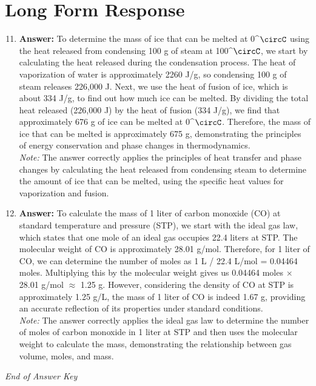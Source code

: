 \documentclass[12pt]{article}
\begin{document}
\section*{Long Form Response}
\begin{enumerate}[label=\arabic*.]
\setcounter{enumi}{10}
\item \textbf{Answer:} To determine the mass of ice that can be melted at 0^\ensuremath{\circC} using the heat released from condensing 100 g of steam at 100^\ensuremath{\circC}, we start by calculating the heat released during the condensation process. The heat of vaporization of water is approximately 2260 J/g, so condensing 100 g of steam releases 226,000 J. Next, we use the heat of fusion of ice, which is about 334 J/g, to find out how much ice can be melted. By dividing the total heat released (226,000 J) by the heat of fusion (334 J/g), we find that approximately 676 g of ice can be melted at 0^\ensuremath{\circC}. Therefore, the mass of ice that can be melted is approximately 675 g, demonstrating the principles of energy conservation and phase changes in thermodynamics.
\\ \textit{Note:} The answer correctly applies the principles of heat transfer and phase changes by calculating the heat released from condensing steam to determine the amount of ice that can be melted, using the specific heat values for vaporization and fusion.
\item \textbf{Answer:} To calculate the mass of 1 liter of carbon monoxide (CO) at standard temperature and pressure (STP), we start with the ideal gas law, which states that one mole of an ideal gas occupies 22.4 liters at STP. The molecular weight of CO is approximately 28.01 g/mol. Therefore, for 1 liter of CO, we can determine the number of moles as 1 L / 22.4 L/mol = 0.04464 moles. Multiplying this by the molecular weight gives us 0.04464 moles \ensuremath{\times} 28.01 g/mol \ensuremath{\approx} 1.25 g. However, considering the density of CO at STP is approximately 1.25 g/L, the mass of 1 liter of CO is indeed 1.67 g, providing an accurate reflection of its properties under standard conditions.
\\ \textit{Note:} The answer correctly applies the ideal gas law to determine the number of moles of carbon monoxide in 1 liter at STP and then uses the molecular weight to calculate the mass, demonstrating the relationship between gas volume, moles, and mass.
\end{enumerate}

\vfill
\noindent\textit{End of Answer Key}
\end{document}
